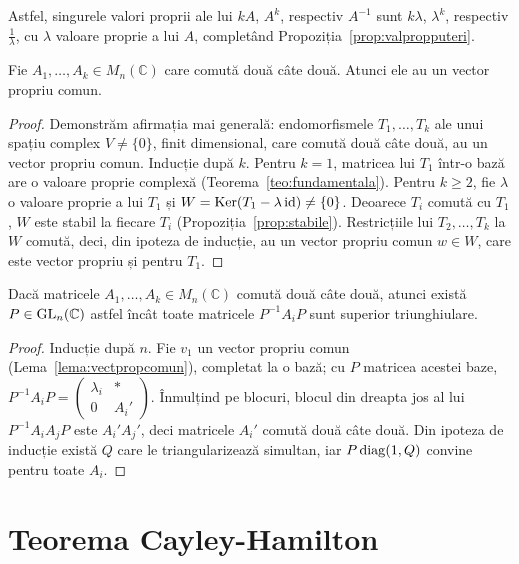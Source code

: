 \begin{observatie}
Astfel, singurele valori proprii ale lui $kA$, $A^k$, respectiv $A^{-1}$ sunt $k\lambda$, $\lambda^k$, respectiv $\frac1\lambda$, cu $\lambda$ valoare proprie a lui $A$, completând Propoziția~\ref{prop:valpropputeri}.
\end{observatie}

\begin{lema}\label{lema:vectpropcomun}
Fie $A_1,\dots,A_k\in M_n(\mathbb{C})$ care comută două câte două. Atunci ele au un vector propriu comun.
\end{lema}

\begin{proof}
Demonstrăm afirmația mai generală: endomorfismele $T_1,\dots,T_k$ ale unui spațiu complex $V\neq\{0\}$, finit dimensional, care comută două câte două, au un vector propriu comun. Inducție după $k$. Pentru $k=1$, matricea lui $T_1$ într-o bază are o valoare proprie complexă (Teorema~\ref{teo:fundamentala}). Pentru $k\ge2$, fie $\lambda$ o valoare proprie a lui $T_1$ și $W=\operatorname{Ker}(T_1-\lambda\,\mathrm{id})\neq\{0\}$. Deoarece $T_i$ comută cu $T_1$, $W$ este stabil la fiecare $T_i$ (Propoziția~\ref{prop:stabile}). Restricțiile lui $T_2,\dots,T_k$ la $W$ comută, deci, din ipoteza de inducție, au un vector propriu comun $w\in W$, care este vector propriu și pentru $T_1$.
\end{proof}

\begin{teorema}\label{teo:triangsimultana}
Dacă matricele $A_1,\dots,A_k\in M_n(\mathbb{C})$ comută două câte două, atunci există $P\in\mathrm{GL}_n(\mathbb{C})$ astfel încât toate matricele $P^{-1}A_iP$ sunt superior triunghiulare.
\end{teorema}

\begin{proof}
Inducție după $n$. Fie $v_1$ un vector propriu comun (Lema~\ref{lema:vectpropcomun}), completat la o bază; cu $P$ matricea acestei baze, $P^{-1}A_iP=\begin{pmatrix}\lambda_i&*\\0&A_i'\end{pmatrix}$. Înmulțind pe blocuri, blocul din dreapta jos al lui $P^{-1}A_iA_jP$ este $A_i'A_j'$, deci matricele $A_i'$ comută două câte două. Din ipoteza de inducție există $Q$ care le triangularizează simultan, iar $P\operatorname{diag}(1,Q)$ convine pentru toate $A_i$.
\end{proof}

\section{Teorema Cayley-Hamilton}


